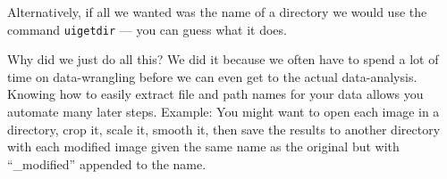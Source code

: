 Alternatively, if all we wanted was the name of a directory we would use the command \lstinline{uigetdir} --- you can guess what it does.

Why did we just do all this? 
We did it because we often have to spend a lot of time on data-wrangling before we can even get to the actual data-analysis. Knowing how to easily extract file and path names for your data allows you automate many later steps. Example: You might want to open each image in a directory, crop it, scale it, smooth it, then save the results to another directory with each modified image given the same name as the original but with ``\_modified'' appended to the name.